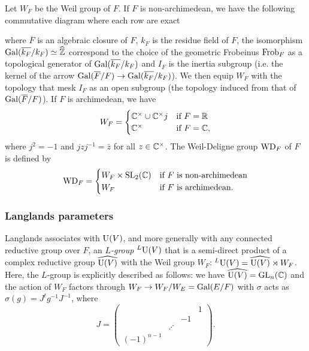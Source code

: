 Let $W_F$ be the Weil group of $F$.
If $F$ is non-archimedean, we have the following commutative diagram where each row are exact
\begin{center}
\end{center}
where $\overline{F}$ is an algebraic closure of $F$, $k_F$ is the residue field of $F$, the isomorphism $\mathrm{Gal}(\overline{k_F} / k_F) \simeq \widehat{\mathbb{Z}}$ correspond to the choice of the geometric Frobeinus $\mathrm{Frob}_F$ as a topological generator of $\mathrm{Gal}(\overline{k_F} / k_F)$ and $I_F$ is the inertia subgroup (i.e. the kernel of the arrow $\mathrm{Gal}(\overline{F}/ F) \to \mathrm{Gal}(\overline{k_F} / k_F)$).
We then equip $W_F$ with the topology that mesk $I_F$ as an open subgroup (the topology induced from that of $\mathrm{Gal}(\overline{F} / F)$).
If $F$ is archimedean, we have
\[
    W_F = \begin{cases} \mathbb{C}^\times \cup \mathbb{C}^\times j & \text{if }F = \mathbb{R} \\ \mathbb{C}^\times & \text{if }F = \mathbb{C},
\end{cases}
\]
where $j^2 = -1$ and $jzj^{-1} = \bar{z}$ for all $z \in \mathbb{C}^\times$.
The Weil-Deligne group $\mathrm{WD}_F$ of $F$ is defined by 
\[
    \mathrm{WD}_F = \begin{cases} W_F \times \mathrm{SL}_2(\mathbb{C}) & \text{if }F\text{ is non-archimedean} \\ W_F & \text{if }F \text{ is archimedean}. \end{cases}
\]


\subsubsection{Langlands parameters}

Langlands associates with $\mathrm{U}(V)$, and more generally with any connected reductive group over $F$, an \emph{$L$-group} ${}^L \mathrm{U}(V)$ that is a semi-direct product of a complex reductive group $\widehat{\mathrm{U}(V)}$ with the Weil group $W_F$: ${}^L \mathrm{U}(V) = \widehat{\mathrm{U}(V)} \rtimes W_F$.
Here, the $L$-group is explicitly described as follows: we have $\widehat{\mathrm{U}(V)} = \mathrm{GL}_n(\mathbb{C})$ and the action of $W_F$ factors through $W_F \to W_F / W_E = \mathrm{Gal}(E/F)$ with $\sigma$ acts as $\sigma(g) = J^{t}g^{-1} J^{-1}$, where
\[
J = \begin{pmatrix} & & & 1 \\
& & -1 & \\
& \iddots & & \\
(-1)^{n-1} & & & 
\end{pmatrix}.
\]

